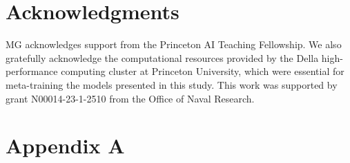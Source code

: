 \documentclass[10pt,letterpaper]{article}
\begin{document}
\section{Acknowledgments}
MG acknowledges support from the Princeton AI Teaching Fellowship. 
We also gratefully acknowledge the computational resources provided by the Della high-performance computing cluster at Princeton University, which were essential for meta-training the models presented in this study. This work was supported by grant N00014-23-1-2510 from the Office of Naval Research.


\nocite{ChalnickBillman1988a}
\nocite{Feigenbaum1963a}
\nocite{Hill1983a}
\nocite{OhlssonLangley1985a}
\nocite{Matlock2001}
\nocite{NewellSimon1972a}
\nocite{ShragerLangley1990a}




\setlength{\bibleftmargin}{.125in}
\setlength{\bibindent}{-\bibleftmargin}




\clearpage
\appendix

\section{Appendix A}
\label{app:detailed_results}
\end{document}
